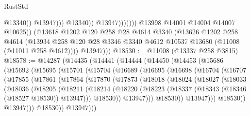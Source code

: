 \begin{lexlean}{RustStd}
\begin{coremodule}
                                        @13340))
                                    @13947)))
                              @13340))
                          @13947)))))))
            @13998
            @14001
            @14004
            @14007
            @10625))
        (@13618
          @1202
          @120
          @258
          @28
          @4614
          @3340
          (@13626
            @1202
            @258
            @4614
            (@13934 @258 @120 @28 @3346 @3340 @4612 @10537 @13680 (@11008 (@11011 @258 @4612))))
          @13947)))
@18530 := @11008 (@13337 @258 @3815)
@18578 := @14287
    (@14435
      (@14441
        (@14444
          (@14450
            (@14453
              (@15686
                (@15692
                  (@15695
                    (@15701
                      (@15704
                        (@16689
                          (@16695
                            (@16698
                              (@16704
                                (@16707
                                  (@17855
                                    (@17861
                                      (@17864
                                        (@17870
                                          (@17873
                                            (@18018
                                              (@18024
                                                (@18027
                                                  (@18033
                                                    (@18036
                                                      (@18205
                                                        (@18211
                                                          (@18214
                                                            (@18220
                                                              (@18223
                                                                (@18337
                                                                  (@18343
                                                                    (@18346 (@18527 @18530))
                                                                    @13947)))
                                                              @18530))
                                                          @13947)))
                                                    @18530))
                                                @13947)))
                                          @18530))
                                      @13947)))
                                @18530))
                            @13947)))

\end{coremodule}
\end{lexlean}

